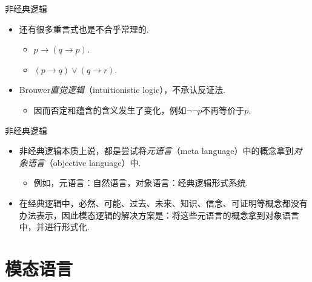     \begin{frame}{非经典逻辑}
    \begin{itemize}
        \item 还有很多重言式也是不合乎常理的.
        \begin{itemize}
            \item $p\to(q\to p)$.
            \item $(p\to q)\vee (q\to r)$.
        \end{itemize}
        \item Brouwer\emph{直觉逻辑}（intuitionistic logic），不承认反证法. 
        \begin{itemize}
            \item 因而否定和蕴含的含义发生了变化，例如$\neg\neg p$不再等价于$p$.
        \end{itemize}
    \end{itemize}
    \end{frame}
    
    \begin{frame}{非经典逻辑}
    \begin{itemize}
        \item 非经典逻辑本质上说，都是尝试将\emph{元语言}（meta language）中的概念拿到\emph{对象语言}（objective language）中.
        \begin{itemize}
        \item 例如，元语言：自然语言，对象语言：经典逻辑形式系统.
        \end{itemize}
        \item 在经典逻辑中，必然、可能、过去、未来、知识、信念、可证明等概念都没有办法表示，因此模态逻辑的解决方案是：将这些元语言的概念拿到对象语言中，并进行形式化.
    \end{itemize}
    \end{frame}
    
    \section{模态语言}
    
